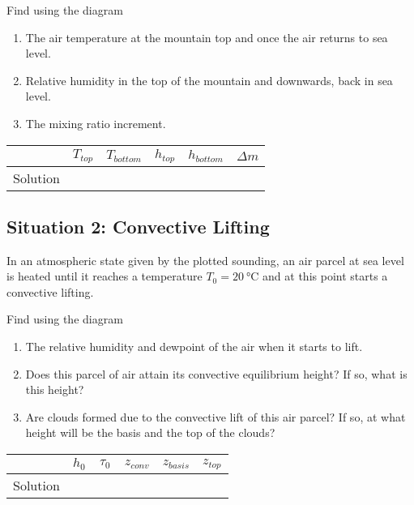 \documentclass{article}
\newcommand{\gc}{\degreeCelsius}
\begin{document}
Find using the diagram
\begin{enumerate}
\item The air temperature at the mountain top and once the air returns
  to sea level.
\item Relative humidity in the top of the mountain and downwards, back
  in sea level.
\item The mixing ratio increment.
\end{enumerate}

\vspace{0.25cm}
\begin{tabular}{c|c|c|c|c|c|}
 & $T_{top}$ & $T_{bottom}$  & $h_{top}$ & $h_{bottom}$  & $\Delta m$ \\
\hline
Solution &~\hspace{2cm}~&~\hspace{2cm}~&~\hspace{2cm}~&~\hspace{2cm}~&~\hspace{2cm}~\\
\hline
\end{tabular}
\subsection{Situation 2: Convective Lifting}
In an atmospheric state given by the plotted sounding, an air parcel
at sea level is heated until it reaches a temperature $T_0 =
\SI{20}{\gc}$ and at this point starts a convective lifting.

Find using the diagram
\begin{enumerate}
\item The relative humidity and dewpoint of the air when it starts to
  lift.
\item Does this parcel of air attain its convective equilibrium
  height? If so, what is this height?
\item Are clouds formed due to the convective lift of this air parcel?
  If so, at what height will be the basis and the top of the clouds? 
\end{enumerate}

\vspace{0.25cm}
\begin{tabular}{c|c|c|c|c|c|}
 & $h_{0}$ & $\tau_{0}$  & $z_{conv}$ & $z_{basis}$  & $z_{top}$ \\
\hline
Solution &~\hspace{2cm}~&~\hspace{2cm}~&~\hspace{2cm}~&~\hspace{2cm}~&~\hspace{2cm}~\\
\hline
\end{tabular}






\end{document}
